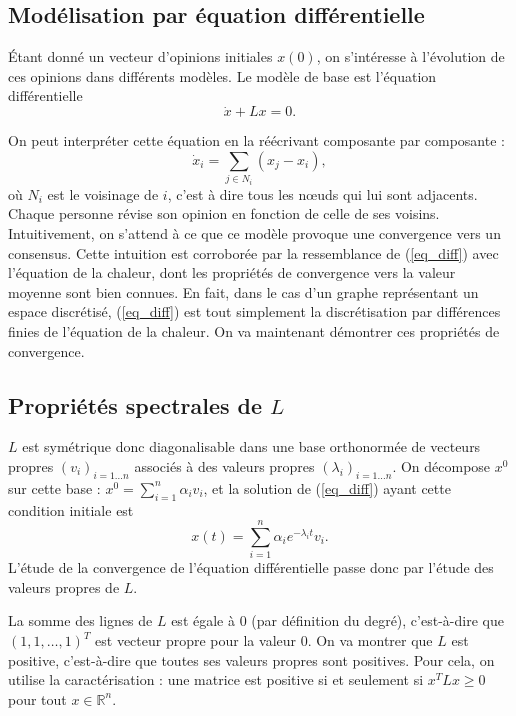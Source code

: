 \documentclass[12pt]{article}
\newcommand{\R}{\mathbb{R}}
\begin{document}
\subsection{Modélisation par équation différentielle}
Étant donné un vecteur d'opinions initiales $x(0)$, on
s'intéresse à l'évolution de ces opinions dans différents
modèles. Le modèle de base est l'équation différentielle
\begin{equation}
 \label{eq_diff}
 \dot x + L x = 0.
\end{equation}

On peut interpréter cette équation en la réécrivant composante par composante :
\begin{equation}
 \label{eq_diff_scal}
 \dot {x}_i = \sum_{j \in N_i} (x_j - x_i),
\end{equation}
où $N_i$ est le voisinage de $i$, c'est à dire tous les n\oe uds qui lui
sont adjacents. Chaque personne révise son opinion en fonction de
celle de ses voisins. Intuitivement, on s'attend à ce que ce modèle
provoque une convergence vers un consensus. Cette intuition est
corroborée par la ressemblance de (\ref{eq_diff}) avec l'équation de
la chaleur, dont les propriétés de convergence vers la valeur moyenne
sont bien connues. En fait, dans le cas d'un graphe représentant un
espace discrétisé, (\ref{eq_diff}) est tout simplement la
discrétisation par différences finies de l'équation de la chaleur. On
va maintenant démontrer ces propriétés de convergence.

\subsection{Propriétés spectrales de $L$}
\label{props_spectrales_L}
$L$ est symétrique donc diagonalisable dans une base orthonormée de
vecteurs propres $(v_i)_{i=1\dots n}$ associés à des valeurs propres
$(\lambda_i)_{i=1 \dots n}$. On décompose $x^0$ sur cette base : $x^0
= \sum_{i=1}^n \alpha_i v_i$, et la solution de (\ref{eq_diff}) ayant
cette condition initiale est $$x(t) = \sum_{i=1}^n \alpha_i e^{-
 \lambda_i t} v_i.$$ L'étude de la convergence de l'équation
différentielle passe donc par l'étude des valeurs propres de $L$.

La somme des lignes de $L$ est égale à $0$ (par définition du degré),
c'est-à-dire que $(1, 1, \dots, 1)^T$ est vecteur propre pour la valeur
$0$. On va montrer que $L$ est positive, c'est-à-dire que toutes ses
valeurs propres sont positives. Pour cela, on utilise la
caractérisation : une matrice est positive si et seulement si $x^T L x \geq 0$ pour
tout $x \in \R^n$.
\end{document}
